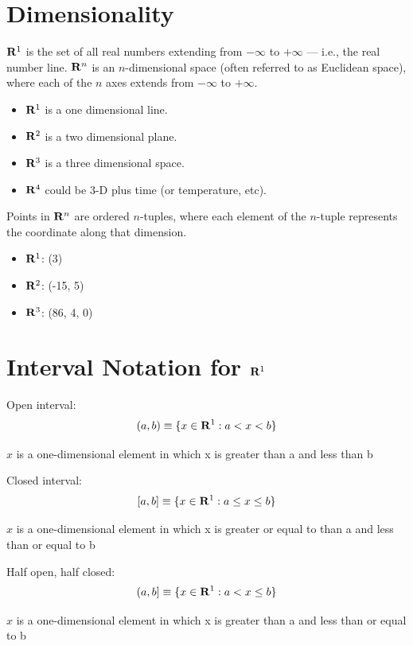\documentclass[]{book}
\providecommand{\tightlist}{%
  \setlength{\itemsep}{0pt}\setlength{\parskip}{0pt}}
\theoremstyle{definition}
\theoremstyle{definition}
\theoremstyle{definition}
\theoremstyle{remark}
\begin{document}
\section{Dimensionality}\label{dimensionality}

\({\bf R}^1\) is the set of all real numbers extending from \(-\infty\)
to \(+\infty\) --- i.e., the real number line. \({\bf R}^n\) is an
\(n\)-dimensional space (often referred to as Euclidean space), where
each of the \(n\) axes extends from \(-\infty\) to \(+\infty\).

\begin{itemize}
\tightlist
\item
  \({\bf R}^1\) is a one dimensional line.
\item
  \({\bf R}^2\) is a two dimensional plane.
\item
  \({\bf R}^3\) is a three dimensional space.
\item
  \({\bf R}^4\) could be 3-D plus time (or temperature, etc).
\end{itemize}

Points in \({\bf R}^n\) are ordered \(n\)-tuples, where each element of
the \(n\)-tuple represents the coordinate along that dimension.

\begin{itemize}
\tightlist
\item
  \({\bf R}^1\): (3)
\item
  \({\bf R}^2\): (-15, 5)
\item
  \({\bf R}^3\): (86, 4, 0)
\end{itemize}

\section{\texorpdfstring{Interval Notation for
\({\bf R}^1\)}{Interval Notation for \{\textbackslash{}bf R\}\^{}1}}\label{interval-notation-for-bf-r1}

Open interval: \[(a,b)\equiv \{ x\in{\bf R}^1: a<x<b\}\]

\(x\) is a one-dimensional element in which x is greater than a and less
than b

Closed interval: \[[a,b]\equiv \{ x\in{\bf R}^1: a\le x \le b\}\]

\(x\) is a one-dimensional element in which x is greater or equal to
than a and less than or equal to b

Half open, half closed: \[(a,b]\equiv \{ x\in{\bf R}^1: a<x\le b\}\]

\(x\) is a one-dimensional element in which x is greater than a and less
than or equal to b
\end{document}
